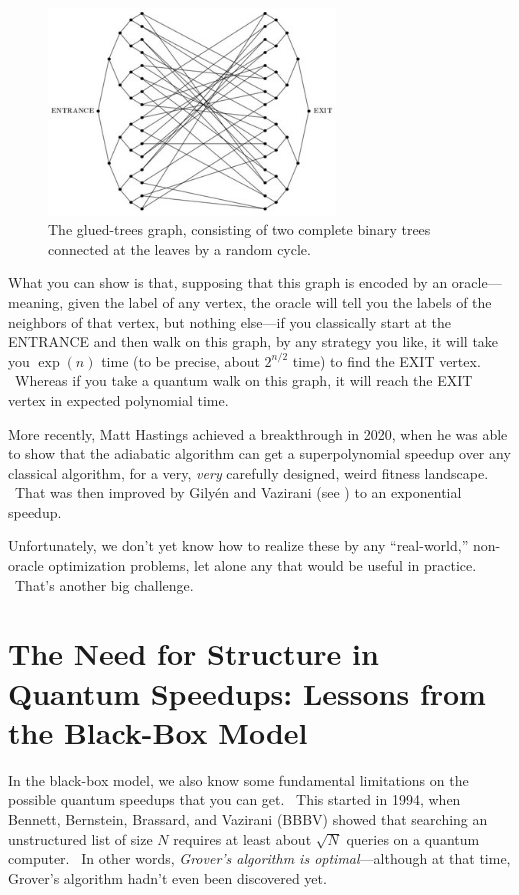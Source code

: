 \documentclass[12pt]{article}
\begin{document}
\begin{figure}
\centering
\includegraphics[width=3in]{gluedtrees.jpg}
\caption{The glued-trees graph, consisting of two complete binary trees connected at the leaves by a random cycle.}
\label{gluedtrees}
\end{figure}

What you can show is that, supposing that this graph is encoded by an oracle---meaning, given the label of any vertex, the oracle will tell you the labels of the neighbors of that vertex, but nothing else---if you classically start at the ENTRANCE and then walk on this graph, by any strategy you like, it will take you $\exp(n)$ time (to be precise, about $2^{n/2}$ time) to find the EXIT vertex. \ Whereas if you take a quantum walk on this graph, it will reach the EXIT vertex in expected polynomial time.

More recently, Matt Hastings \cite{hastings:adiabatic} achieved a breakthrough in 2020, when he was able to show that the adiabatic algorithm can get a superpolynomial speedup over any classical algorithm, for a very, \emph{very} carefully designed, weird fitness landscape. \ That was then improved by Gily\'{e}n and Vazirani (see \cite{gilyenvazirani}) to an exponential speedup.

Unfortunately, we don't yet know how to realize these by any ``real-world,'' non-oracle optimization problems, let alone any that would be useful in practice. \ That's another big challenge.


\section{The Need for Structure in Quantum Speedups: Lessons from the Black-Box Model}

In the black-box model, we also know some fundamental limitations on the possible quantum speedups that you can get. \ This started in 1994, when Bennett, Bernstein, Brassard, and Vazirani (BBBV) \cite{bbbv} showed that searching an unstructured list of size $N$ requires at least about $\sqrt N$ queries on a quantum computer. \ In other words, \emph{Grover's algorithm is optimal}---although at that time, Grover's algorithm hadn't even been discovered yet.
\end{document}
